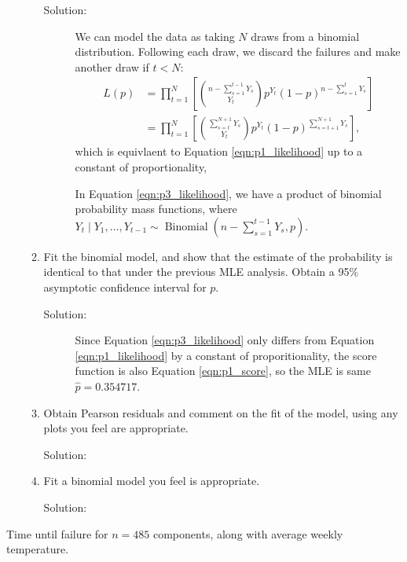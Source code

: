 \documentclass[letterpaper,11pt]{article}
\begin{document}
\begin{enumerate}
\begin{enumerate}
      \begin{description}
      \item[Solution:] We can model the data as taking $N$ draws from a binomial
        distribution. Following each draw, we discard the failures and make
        another draw if $t < N$:
        \begin{align}
          L\left(p\right)
          &= \prod_{t=1}^N \left[
            {n - \sum_{s=1}^{t-1}Y_s
            \choose Y_t}p^{Y_t}\left(1 - p\right)^{n - \sum_{s=1}^{t}Y_s}
            \right]
            \label{eqn:p3_likelihood} \\
          &= \prod_{t=1}^N \left[
            {\sum_{s = t}^{N+1}Y_s \choose Y_t}
            p^{Y_t}\left(1 - p\right)^{\sum_{s = t + 1}^{N+1} Y_s}\right],
            \nonumber
        \end{align}
        which is equivlaent to Equation \ref{eqn:p1_likelihood} up to a constant
        of proportionality,

        In Equation \ref{eqn:p3_likelihood}, we have a product of binomial
        probability mass functions, where
        $Y_t \mid Y_1,\ldots,Y_{t-1} \sim \operatorname{Binomial}\left(
          n - \sum_{s=1}^{t - 1}Y_s, p \right).$
      \end{description}
    \item Fit the binomial model, and show that the estimate of the probability
      is identical to that under the previous MLE analysis. Obtain a 95\%
      asymptotic confidence interval for $p$.
      \begin{description}
      \item[Solution:] Since Equation \ref{eqn:p3_likelihood} only differs from
        Equation \ref{eqn:p1_likelihood} by a constant of proporitionality, the
        score function is also Equation \ref{eqn:p1_score}, so the MLE is same
        $\hat{p} = 0.354717$.

        
      \end{description}
    \item Obtain Pearson residuals and comment on the fit of the model, using
      any plots you feel are appropriate.
      \begin{description}
      \item[Solution:] 
      \end{description}
    \item Fit a binomial model you feel is appropriate.
      \begin{description}
      \item[Solution:] 
      \end{description}
    \end{enumerate}
  \end{enumerate}

\begin{table}
  \centering
  
  \caption{Time until failure for $n = 485$ components, along with average weekly
    temperature.}
  \label{tab:failure_time_data}
\end{table}
\end{document}
